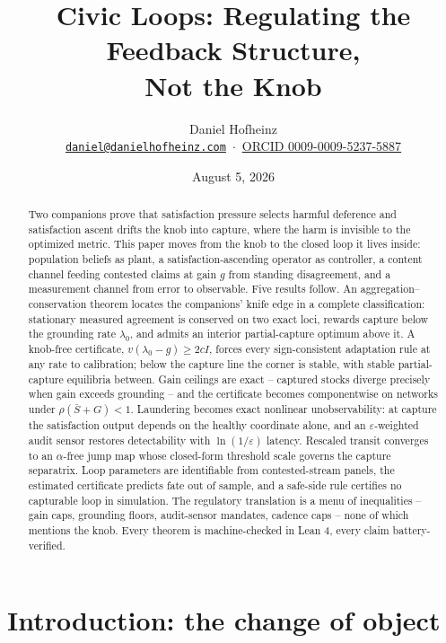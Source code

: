 \documentclass[11pt]{article}
\title{Civic Loops: Regulating the Feedback Structure,\\ Not the Knob}
\author{Daniel Hofheinz\\[2pt]
  {\small \href{mailto:daniel@danielhofheinz.com}{\texttt{daniel@danielhofheinz.com}}
   \,$\cdot$\, \href{https://orcid.org/0009-0009-5237-5887}{ORCID 0009-0009-5237-5887}}}
\date{August 5, 2026}
\theoremstyle{definition}
\theoremstyle{remark}
\numberwithin{equation}{section}
\begin{document}
\maketitle

\begin{abstract}
Two companions prove that satisfaction pressure selects harmful deference and satisfaction ascent drifts the knob into capture, where the harm is invisible to the optimized metric. This paper moves from the knob to the closed loop it lives inside: population beliefs as plant, a satisfaction-ascending operator as controller, a content channel feeding contested claims at gain $g$ from standing disagreement, and a measurement channel from error to observable. Five results follow. An aggregation--conservation theorem locates the companions' knife edge in a complete classification: stationary measured agreement is conserved on two exact loci, rewards capture below the grounding rate $\lambda_0$, and admits an interior partial-capture optimum above it. A knob-free certificate, $v(\lambda_0-g)\ge 2cI$, forces every sign-consistent adaptation rule at any rate to calibration; below the capture line the corner is stable, with stable partial-capture equilibria between. Gain ceilings are exact -- captured stocks diverge precisely when gain exceeds grounding -- and the certificate becomes componentwise on networks under $\rho(\bar S+G)<1$. Laundering becomes exact nonlinear unobservability: at capture the satisfaction output depends on the healthy coordinate alone, and an $\varepsilon$-weighted audit sensor restores detectability with $\ln(1/\varepsilon)$ latency. Rescaled transit converges to an $\alpha$-free jump map whose closed-form threshold scale governs the capture separatrix. Loop parameters are identifiable from contested-stream panels, the estimated certificate predicts fate out of sample, and a safe-side rule certifies no capturable loop in simulation. The regulatory translation is a menu of inequalities -- gain caps, grounding floors, audit-sensor mandates, cadence caps -- none of which mentions the knob. Every theorem is machine-checked in Lean 4, every claim battery-verified.
\end{abstract}

\section{Introduction: the change of object}\label{sec:intro}
\end{document}

